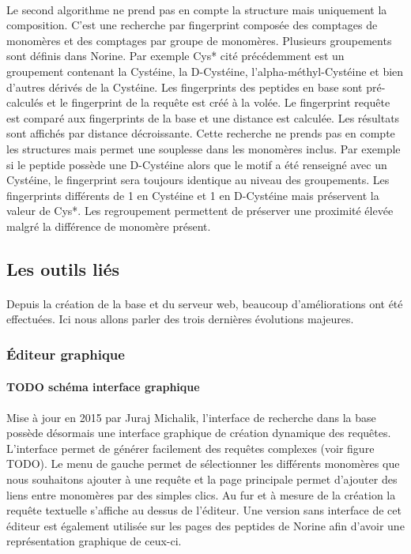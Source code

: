 \documentclass[12pt,french,twoside]{report}
\begin{document}
\paragraph{}Le second algorithme ne prend pas en compte la structure mais uniquement la composition.
C'est une recherche par fingerprint composée des comptages de monomères et des comptages par groupe de monomères.
Plusieurs groupements sont définis dans Norine.
Par exemple Cys* cité précédemment est un groupement contenant la Cystéine, la D-Cystéine, l'alpha-méthyl-Cystéine et bien d'autres dérivés de la Cystéine.
Les fingerprints des peptides en base sont pré-calculés et le fingerprint de la requête est créé à la volée.
Le fingerprint requête est comparé aux fingerprints de la base et une distance est calculée.
Les résultats sont affichés par distance décroissante.
Cette recherche ne prends pas en compte les structures mais permet une souplesse dans les monomères inclus.
Par exemple si le peptide possède une D-Cystéine alors que le motif a été renseigné avec un Cystéine, le fingerprint sera toujours identique au niveau des groupements.
Les fingerprints différents de 1 en Cystéine et 1 en D-Cystéine mais préservent la valeur de Cys*.
Les regroupement permettent de préserver une proximité élevée malgré la différence de monomère présent.



\subsection{Les outils liés}

\paragraph{}Depuis la création de la base et du serveur web, beaucoup d'améliorations ont été effectuées.
Ici nous allons parler des trois dernières évolutions majeures.


\subsubsection{Éditeur graphique}

\paragraph{TODO schéma interface graphique}

\paragraph{}Mise à jour en 2015 par Juraj Michalik, l'interface de recherche dans la base possède désormais une interface graphique de création dynamique des requêtes.
L'interface permet de générer facilement des requêtes complexes (voir figure TODO).
Le menu de gauche permet de sélectionner les différents monomères que nous souhaitons ajouter à une requête et la page principale permet d'ajouter des liens entre monomères par des simples clics.
Au fur et à mesure de la création la requête textuelle s'affiche au dessus de l'éditeur.
Une version sans interface de cet éditeur est également utilisée sur les pages des peptides de Norine afin d'avoir une représentation graphique de ceux-ci.
\end{document}
